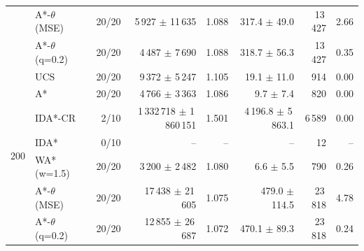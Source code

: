 \begin{tabular}{llrrrrrr}
 & A*-$\theta$ (MSE) & 20/20 & 5\,927 $\pm$ 11\,635 & 1.088 & 317.4 $\pm$ 49.0 & 13\,427 & 2.66 \\
 & A*-$\theta$ (q=0.2) & 20/20 & 4\,487 $\pm$ 7\,690 & 1.088 & 318.7 $\pm$ 56.3 & 13\,427 & 0.35 \\
\midrule
\multirow{7}{*}{200} & UCS & 20/20 & 9\,372 $\pm$ 5\,247 & 1.105 & 19.1 $\pm$ 11.0 & 914 & 0.00 \\
 & A* & 20/20 & 4\,766 $\pm$ 3\,363 & 1.086 & 9.7 $\pm$ 7.4 & 820 & 0.00 \\
 & IDA*-CR & 2/10 & 1\,332\,718 $\pm$ 1\,860\,151 & 1.501 & 4\,196.8 $\pm$ 5\,863.1 & 6\,589 & 0.00 \\
 & IDA* & 0/10 & -- & -- & -- & 12 & -- \\
 & WA* (w=1.5) & 20/20 & 3\,200 $\pm$ 2\,482 & 1.080 & 6.6 $\pm$ 5.5 & 790 & 0.26 \\
 & A*-$\theta$ (MSE) & 20/20 & 17\,438 $\pm$ 21\,605 & 1.075 & 479.0 $\pm$ 114.5 & 23\,818 & 4.78 \\
 & A*-$\theta$ (q=0.2) & 20/20 & 12\,855 $\pm$ 26\,687 & 1.072 & 470.1 $\pm$ 89.3 & 23\,818 & 0.24 \\
\bottomrule
\end{tabular}
